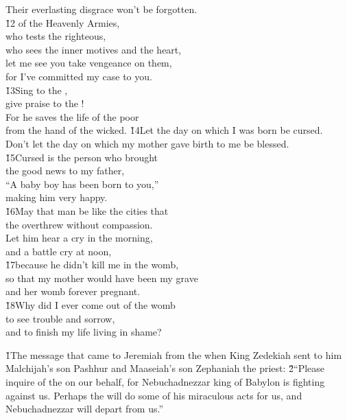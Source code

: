 \begin{poetry}
\poemlll       Their everlasting disgrace won't be forgotten. \\
\poeml \v{12} of the Heavenly Armies, \\
\poemll    who tests the righteous, \\
\poemll    who sees the inner motives and the heart, \\
\poeml let me see you take vengeance on them, \\
\poemll    for I've committed my case to you. \\
\poeml \v{13}Sing to the , \\
\poemll    give praise to the ! \\
\poeml For he saves the life of the poor \\
\poemll    from the hand of the wicked.
\poeml \v{14}Let the day on which I was born be cursed. \\
\poemll    Don't let the day on which my mother gave birth to me be blessed. \\
\poeml \v{15}Cursed is the person who brought \\
\poemll    the good news to my father, \\
\poeml ``A baby boy has been born to you,'' \\
\poemll    making him very happy. \\
\poeml \v{16}May that man be like the cities that \\
\poemll    the  overthrew without compassion. \\
\poeml Let him hear a cry in the morning, \\
\poemll    and a battle cry at noon, \\
\poeml \v{17}because he didn't kill me in the womb, \\
\poemll    so that my mother would have been my grave \\
\poemlll       and her womb forever pregnant. \\
\poeml \v{18}Why did I ever come out of the womb \\
\poemll    to see trouble and sorrow, \\
\poemlll       and to finish my life living in shame?
\end{poetry}

\v{1}The message that came to Jeremiah from the  when King Zedekiah sent to him Malchijah's son Pashhur and Maaseiah's son Zephaniah the priest: \v{2}``Please inquire of the  on our behalf, for Nebuchadnezzar king of Babylon is fighting against us. Perhaps the  will do some of his miraculous acts for us, and Nebuchadnezzar will depart from us.''


